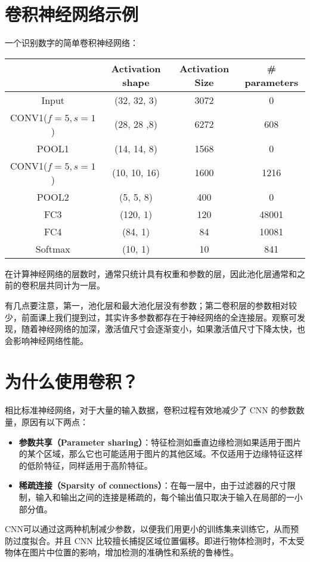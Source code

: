 \documentclass[../../main.tex]{subfiles}
\begin{document}
\section{卷积神经网络示例}
一个识别数字的简单卷积神经网络：
\begin{table}[H]
    \centering
    \begin{tabular}{|c|c|c|c|}
        \hline
                            & Activation shape & Activation Size & \# parameters \\ \hline
        Input               & (32, 32, 3)      & 3072            & 0            \\ \hline
        CONV1(\(f=5, s=1\)) & (28, 28 ,8)      & 6272            & 608          \\ \hline
        POOL1               & (14, 14, 8)      & 1568            & 0            \\ \hline
        CONV1(\(f=5, s=1\)) & (10, 10, 16)     & 1600            & 1216         \\ \hline
        POOL2               & (5, 5, 8)        & 400             & 0            \\ \hline
        FC3                 & (120, 1)         & 120             & 48001        \\ \hline
        FC4                 & (84, 1)          & 84              & 10081        \\ \hline
        Softmax             & (10, 1)          & 10              & 841          \\ \hline
    \end{tabular}
\end{table}
在计算神经网络的层数时，通常只统计具有权重和参数的层，因此池化层通常和之前的卷积层共同计为一层。

有几点要注意，第一，池化层和最大池化层没有参数；第二卷积层的参数相对较少，前面课上我们提到过，其实许多参数都存在于神经网络的全连接层。观察可发现，随着神经网络的加深，激活值尺寸会逐渐变小，如果激活值尺寸下降太快，也会影响神经网络性能。

\section{为什么使用卷积？}
相比标准神经网络，对于大量的输入数据，卷积过程有效地减少了 CNN 的参数数量，原因有以下两点：
\begin{itemize}
    \item \textbf{参数共享（Parameter sharing）}：特征检测如垂直边缘检测如果适用于图片的某个区域，那么它也可能适用于图片的其他区域。不仅适用于边缘特征这样的低阶特征，同样适用于高阶特征。
    \item \textbf{稀疏连接（Sparsity of connections）}：在每一层中，由于过滤器的尺寸限制，输入和输出之间的连接是稀疏的，每个输出值只取决于输入在局部的一小部分值。
\end{itemize}

CNN可以通过这两种机制减少参数，以便我们用更小的训练集来训练它，从而预防过度拟合。并且 CNN 比较擅长捕捉区域位置偏移。即进行物体检测时，不太受物体在图片中位置的影响，增加检测的准确性和系统的鲁棒性。
\end{document}
